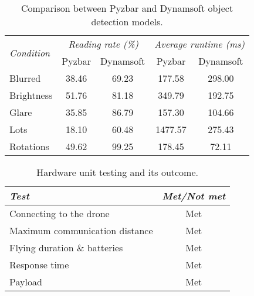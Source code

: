 \documentclass[../main.tex]{subfiles}
\begin{document}
\begin{table}[H]
    \centering
    \caption{Comparison between Pyzbar and Dynamsoft object detection
    models.}
    \begin{tabularx}{0.65\textwidth}{ X c c c c }
        \toprule
        \multirow{2}{*}{\textit{Condition}}
            & \multicolumn{2}{c}{\textit{Reading rate (\%)}}
                & \multicolumn{2}{c}{\textit{Average runtime (ms)}} \\
                \addlinespace

        
            & Pyzbar
            & Dynamsoft
                & Pyzbar
                & Dynamsoft \\

        \midrule
        
        Blurred 
            & 38.46
            & 69.23
                & 177.58
                & 298.00
                \\
        
        Brightness
            & 51.76
            & 81.18
                & 349.79
                & 192.75
                \\
        
        Glare
            & 35.85
            & 86.79
                & 157.30
                & 104.66
                \\
        
        Lots
            & 18.10
            & 60.48
                & 1477.57
                & 275.43
                \\
        
        Rotations
            & 49.62
            & 99.25
                & 178.45
                & 72.11
                \\
        
        \bottomrule		
    \end{tabularx}
\end{table}

\begin{table}[H]
    \centering
    \caption{Hardware unit testing and its outcome.}
    \begin{tabularx}{0.57\textwidth}{ X c }
        \toprule
        \textit{Test} 
            & \textit{Met/Not met} \\

        \midrule
        
        Connecting to the drone
            & Met \\

        Maximum communication distance
            & Met \\

        Flying duration \& batteries
            & Met \\

        Response time
            & Met \\

        Payload
            & Met \\
        
        \bottomrule		
    \end{tabularx}
\end{table}
\end{document}
